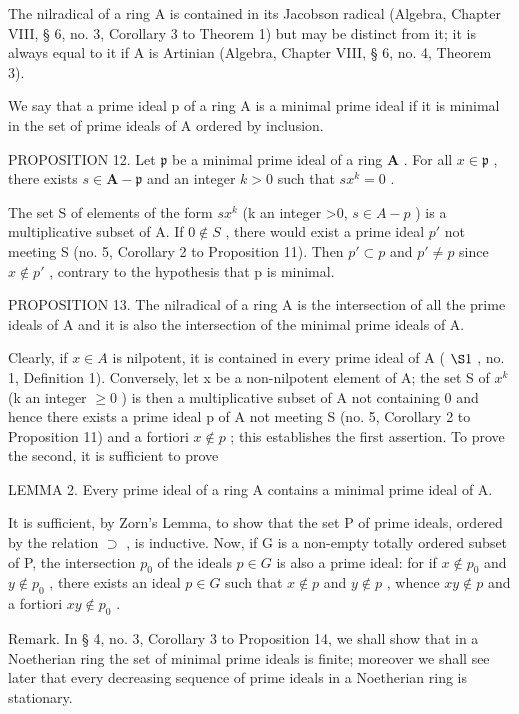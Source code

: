 The nilradical of a ring A is contained in its Jacobson radical (Algebra, Chapter VIII, § 6, no. 3, Corollary 3 to Theorem 1) but may be distinct from it; it is always equal to it if A is Artinian (Algebra, Chapter VIII, § 6, no. 4, Theorem 3).

We say that a prime ideal p of a ring A is a minimal prime ideal if it is minimal in the set of prime ideals of A ordered by inclusion.

PROPOSITION 12. Let \(\mathfrak{p}\) be a minimal prime ideal of a ring \(\mathbf{A}\) . For all \(x \in \mathfrak{p}\) , there exists \(s \in \mathbf{A} - \mathfrak{p}\) and an integer \(k > 0\) such that \(sx^k = 0\) .

The set S of elements of the form \(sx^{k}\) (k an integer \textgreater0, \(s \in A - p\) ) is a multiplicative subset of A. If \(0 \notin S\) , there would exist a prime ideal \(p'\) not meeting S (no. 5, Corollary 2 to Proposition 11). Then \(p' \subset p\) and \(p' \neq p\) since \(x \notin p'\) , contrary to the hypothesis that p is minimal.

PROPOSITION 13. The nilradical of a ring A is the intersection of all the prime ideals of A and it is also the intersection of the minimal prime ideals of A.

Clearly, if \(x \in A\) is nilpotent, it is contained in every prime ideal of A ( \(\S 1\) , no. 1, Definition 1). Conversely, let x be a non-nilpotent element of A; the set S of \(x^{k}\) (k an integer \(\geqslant 0\) ) is then a multiplicative subset of A not containing 0 and hence there exists a prime ideal p of A not meeting S (no. 5, Corollary 2 to Proposition 11) and a fortiori \(x \notin p\) ; this establishes the first assertion. To prove the second, it is sufficient to prove

LEMMA 2. Every prime ideal of a ring A contains a minimal prime ideal of A.

It is sufficient, by Zorn's Lemma, to show that the set P of prime ideals, ordered by the relation \(\supset\) , is inductive. Now, if G is a non-empty totally ordered subset of P, the intersection \(p_{0}\) of the ideals \(p \in G\) is also a prime ideal: for if \(x \notin p_{0}\) and \(y \notin p_{0}\) , there exists an ideal \(p \in G\) such that \(x \notin p\) and \(y \notin p\) , whence \(xy \notin p\) and a fortiori \(xy \notin p_{0}\) .

Remark. In § 4, no. 3, Corollary 3 to Proposition 14, we shall show that in a Noetherian ring the set of minimal prime ideals is finite; moreover we shall see later that every decreasing sequence of prime ideals in a Noetherian ring is stationary.

